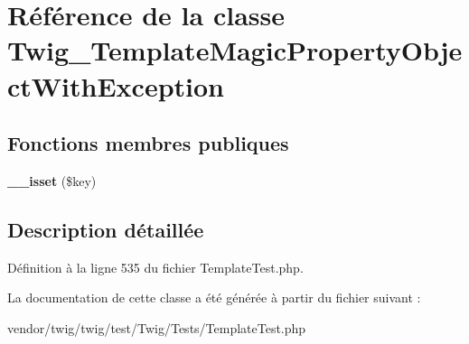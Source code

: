 \hypertarget{class_twig___template_magic_property_object_with_exception}{}\section{Référence de la classe Twig\+\_\+\+Template\+Magic\+Property\+Object\+With\+Exception}
\label{class_twig___template_magic_property_object_with_exception}
\subsection*{Fonctions membres publiques}
\begin{DoxyCompactItemize}
\item 
{\bfseries \+\_\+\+\_\+isset} (\$key)\hypertarget{class_twig___template_magic_property_object_with_exception_ae858fed7cd2822fbceac154138b68baa}{}\label{class_twig___template_magic_property_object_with_exception_ae858fed7cd2822fbceac154138b68baa}

\end{DoxyCompactItemize}


\subsection{Description détaillée}


Définition à la ligne 535 du fichier Template\+Test.\+php.



La documentation de cette classe a été générée à partir du fichier suivant \+:\begin{DoxyCompactItemize}
\item 
vendor/twig/twig/test/\+Twig/\+Tests/Template\+Test.\+php\end{DoxyCompactItemize}
